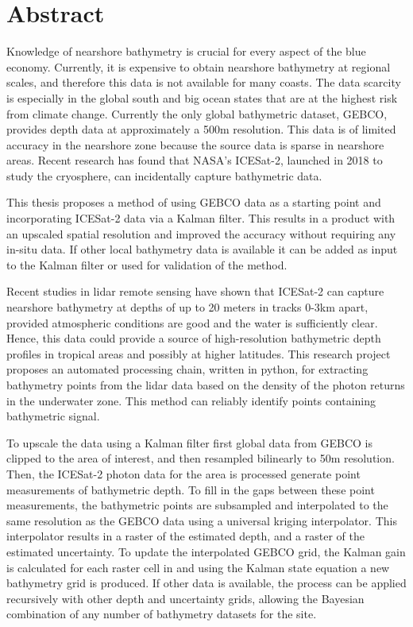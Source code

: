 \chapter*{Abstract}

\noindent Knowledge of nearshore bathymetry is crucial for every aspect of the blue economy. Currently, it is expensive to obtain nearshore bathymetry at regional scales, and therefore this data is not available for many coasts. The data scarcity is especially in the global south and big ocean states that are at the highest risk from climate change. Currently the only global bathymetric dataset, GEBCO, provides depth data at approximately a 500m resolution. This data is of limited accuracy in the nearshore zone because the source data is sparse in nearshore areas. Recent research has found that NASA's ICESat-2, launched in 2018 to study the cryosphere, can incidentally capture bathymetric data. 


\noindent This thesis proposes a method of using GEBCO data as a starting point and incorporating ICESat-2 data via a Kalman filter. This results in a product with an upscaled spatial resolution and improved the accuracy without requiring any in-situ data. If other local bathymetry data is available it can be added as input to the Kalman filter or used for validation of the method. 


\noindent Recent studies in lidar remote sensing have shown that ICESat-2 can capture nearshore bathymetry at depths of up to 20 meters in tracks 0-3km apart, provided atmospheric conditions are good and the water is sufficiently clear. Hence, this data could provide a source of high-resolution bathymetric depth profiles in tropical areas and possibly at higher latitudes. This research project proposes an automated processing chain, written in python, for extracting bathymetry points from the lidar data based on the density of the photon returns in the underwater zone. This method can reliably identify points containing bathymetric signal. 


\noindent To upscale the data using a Kalman filter first global data from GEBCO is clipped to the area of interest, and then resampled bilinearly to 50m resolution. Then, the ICESat-2 photon data for the area is processed generate point measurements of bathymetric depth. To fill in the gaps between these point measurements, the bathymetric points are subsampled and interpolated to the same resolution as the GEBCO data using a universal kriging interpolator. This interpolator results in a raster of the estimated depth, and a raster of the estimated uncertainty. To update the interpolated GEBCO grid, the Kalman gain is calculated for each raster cell in and using the Kalman state equation a new bathymetry grid is produced. If other data is available, the process can be applied recursively with other depth and uncertainty grids, allowing the Bayesian combination of any number of bathymetry datasets for the site.

